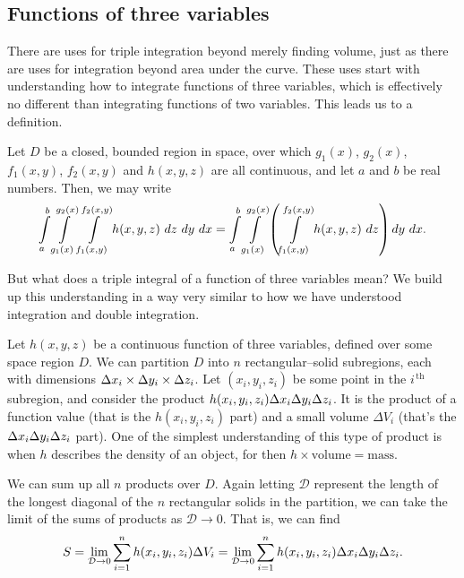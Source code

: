 \subsection{Functions of three variables}

There are uses for triple integration beyond merely finding volume, just as there are uses for integration beyond area under the curve. These uses start with understanding how to integrate functions of three variables, which is effectively no different than integrating functions of two variables. This leads us to a definition.

\begin{definition}
\label{def:triple_integral_2}
Let $D$ be a closed, bounded region in space, over which $g_1(x)$, $g_2(x)$, $f_1(x,y)$, $f_2(x,y)$ and $h(x,y,z)$ are all continuous, and let $a$ and $b$ be real numbers. Then, we may write 
$$\ds \int\limits_a^b\int\limits_{g_1(x)}^{g_2(x)}\int\limits_{f_1(x,y)}^{f_2(x,y)} h(x,y,z)\ dz\ dy\ dx=\int\limits_a^b\int\limits_{g_1(x)}^{g_2(x)}\left(\int\limits_{f_1(x,y)}^{f_2(x,y)} h(x,y,z)\ dz\right) dy\ dx.$$

\end{definition}

But what does a triple integral of a function of three variables mean?  We build up this understanding in a way very similar to how we have understood integration and double integration.

Let $h(x,y,z)$ be a continuous function of three variables, defined over some space region $D$. We can partition $D$ into $n$ rectangular--solid subregions, each with dimensions $\Delta x_i\times\Delta y_i\times\Delta z_i$. Let $(x_i,y_i,z_i)$ be some point in the $i^{\,\text{th}}$ subregion, and consider the product $h(x_i,y_i,z_i)\Delta x_i\Delta y_i\Delta z_i$. It is the product of a function value (that is the $h(x_i,y_i,z_i)$ part) and a small volume $\Delta V_i$ (that's the $\Delta x_i\Delta y_i\Delta z_i$ part). One of the simplest understanding of this type of product is when $h$ describes the density of an object, for then $h\times\text{volume}=\text{mass}$.

We can sum up all $n$ products over $D$. Again letting $\mathcal{D}$ represent the length of the longest diagonal of the $n$ rectangular solids in the partition, we can take the limit of the sums of products as $\mathcal{D}\to 0$. That is, we can find
$$ S = \lim_{\mathcal{D}\to 0} \sum_{i=1}^n h(x_i,y_i,z_i)\Delta V_i=\lim_{\mathcal{D}\to 0} \sum_{i=1}^n h(x_i,y_i,z_i)\Delta x_i\Delta y_i\Delta z_i.$$

